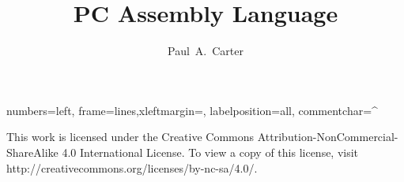 \documentclass[11pt]{book}
\author{Paul~A.~Carter}
\title{PC Assembly Language}
\newif\ifmypdf
\begin{document}
\maketitle
\newlength{\AsmMargin}
\setlength{\AsmMargin}{-1cm}
{numbers=left, frame=lines,xleftmargin=\AsmMargin, labelposition=all, commentchar=^ }

\newcommand{\MarginNote}[1]{\marginpar{\sloppy \em \small #1}}
\thispagestyle{empty}
\vspace*{\fill}
\noindent This work is licensed under the Creative Commons 
Attribution-NonCommercial-ShareAlike 4.0 International License. To view
a copy of this license, visit
{\code http://creativecommons.org/licenses/by-nc-sa/4.0/}.



\vfill
\frontmatter


\mainmatter







%
\begin{appendix}

\end{appendix}
\clearpage
\ifmypdf
\phantomsection %
\fi
{}
\printindex
\end{document}
